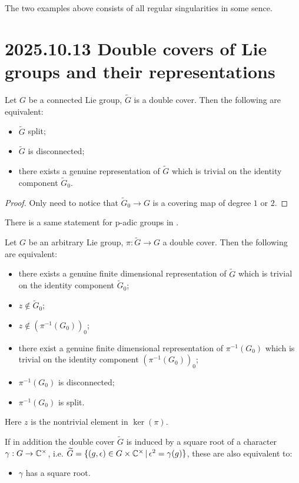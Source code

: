 \documentclass[12pt]{amsart}
\numberwithin{equation}{section}
\renewcommand{\tilde}{\widetilde}
\newcommand{\set}[2]{\{#1\,|\,#2\}}
\begin{document}
\begin{rk}
  The two examples above consists of all regular singularities in some sence.
\end{rk}




\section{2025.10.13 Double covers of Lie groups and their representations}
\begin{lem}
  Let $G$ be a connected Lie group, $\tilde{G}$ is a double cover. Then the following are equivalent:
  \begin{itemize}
    \item $\tilde{G}$ split;
    \item $\tilde{G}$ is disconnected;
    \item there exists a genuine representation of $\tilde{G}$ which is trivial on the identity component $\tilde{G}_0$.
  \end{itemize}
\end{lem}

\begin{proof}
  Only need to notice that $\tilde{G}_{0} \to G$ is a covering map of degree $1$ or $2$.
\end{proof}

There is a same statement for p-adic groups in \cite{Nev99}.


\begin{lem}
  Let $G$ be an arbitrary Lie group, $\pi : \tilde{G} \to G$ a double cover. Then the following are equivalent:
  \begin{itemize}
    \item there exists a genuine finite dimensional representation of $\tilde{G}$ which is trivial on the identity component $\tilde{G}_0$;
    \item $z \notin \tilde{G}_0$;
    \item $z \notin (\pi^{-1}(G_0))_0$;
    \item there exist a genuine finite dimensional representation of $\pi^{-1}(G_0)$ which is trivial on the identity component $(\pi^{-1}(G_0))_0$;
    \item $\pi^{-1}(G_0)$ is disconnected;
    \item $\pi^{-1}(G_0)$ is split.  
  \end{itemize}
  Here $z$ is the nontrivial element in $\ker(\pi)$.
  
  If in addition the double cover $\tilde{G}$ is induced by a square root of a character $\gamma : G \to {\mathbb {C}}^{\times}$, i.e. $\tilde{G} = \set{(g,\epsilon) \in G \times \BC^{\times}}{\epsilon^2 = \gamma(g)}$, these are also equivalent to:
  \begin{itemize}
    \item $\gamma$ has a square root.
  \end{itemize}
\end{lem}
\end{document}
